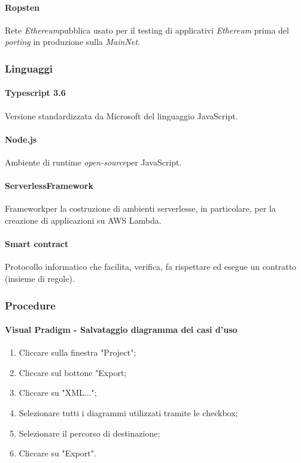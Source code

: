 \paragraph{Ropsten}
Rete \textit{Ethereum}\glo pubblica usato per il testing di applicativi \textit{Ethereum\glo} prima
del \textit{porting\glo} in produzione sulla \textit{MainNet\glos}.

\newpage \subsubsection{Linguaggi}
\paragraph{Typescript 3.6}
Versione standardizzata da Microsoft del linguaggio JavaScript.

\paragraph{Node.js}
Ambiente di runtime \textit{open-source}\glo per JavaScript.

\paragraph{Serverless\glo Framework\glo}
Framework\glo per la costruzione di ambienti serverless\glos e, in particolare, per la creazione di applicazioni su AWS Lambda.

\paragraph{Smart contract\glo}
Protocollo informatico che facilita, verifica, fa rispettare ed esegue un
contratto (insieme di regole).\\

\subsubsection{Procedure}
\paragraph{Visual Pradigm - Salvataggio diagramma dei casi d'uso}
\begin{enumerate}
	\item Cliccare sulla finestra "Project";
	\item Cliccare sul bottone "Export;
	\item Cliccare su "XML...";
	\item Selezionare tutti i diagrammi utilizzati tramite le checkbox;
	\item Selezionare il percorso di destinazione;
	\item Cliccare su "Export".
\end{enumerate}

